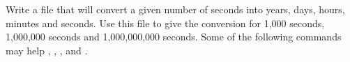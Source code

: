 {Write a file that will convert a given number of seconds into years, days, hours, minutes and seconds.  Use this file to give the conversion for \textrm{1,000} seconds, \textrm{1,000,000} seconds and \textrm{1,000,000,000} seconds.  Some of the following commands may help , , , and .}
{}
